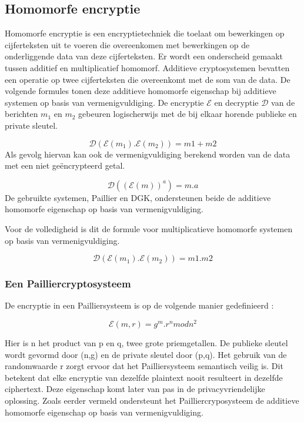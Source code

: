 \subsection{Homomorfe encryptie}
Homomorfe encryptie is een encryptietechniek die toelaat om bewerkingen op cijferteksten uit te voeren die overeenkomen met bewerkingen op de onderliggende data van deze cijferteksten. Er wordt een onderscheid gemaakt tussen additief en multiplicatief homomorf. Additieve cryptosystemen bevatten een operatie op twee cijferteksten die overeenkomt met de som van de data. De volgende formules \cite{erkin:generating} tonen deze additieve homomorfe eigenschap bij additieve systemen op basis van vermenigvuldiging. De encryptie $\mathcal{E}$ en decryptie $\mathcal{D}$ van de berichten $m_1$ en $m_2$ gebeuren logischerwijs met de bij elkaar horende publieke en private sleutel.

\begin{equation}\label{pearson}\mathcal{D}(\mathcal{E}(m_1).\mathcal{E}(m_2)) = m1 + m2
\end{equation}
Als gevolg hiervan kan ook de vermenigvuldiging berekend worden van de data met een niet ge\"encrypteerd getal.

\begin{equation}\label{pearson}\mathcal{D}((\mathcal{E}(m))^a) = m.a
\end{equation}
De gebruikte systemen, Paillier en DGK, ondersteunen beide de additieve homomorfe eigenschap op basis van vermenigvuldiging.

Voor de volledigheid is dit de formule voor multiplicatieve homomorfe systemen op basis van vermenigvuldiging.

\begin{equation}\label{pearson}\mathcal{D}(\mathcal{E}(m_1).\mathcal{E}(m_2)) = m1 . m2
\end{equation}
\subsubsection{Een Pailliercryptosysteem}
\label{paillier}
De encryptie in een Pailliersysteem is op de volgende manier gedefinieerd \cite{erkin:generating}:

\begin{equation}\label{pearson}\mathcal{E}(m,r) = g^m.r^n mod n^2
\end{equation}

Hier is n het product van p en q, twee grote priemgetallen. De publieke sleutel wordt gevormd door (n,g) en de private sleutel door (p,q). Het gebruik van de randomwaarde r zorgt ervoor dat het Pailliersysteem semantisch veilig is. Dit betekent dat elke encryptie van dezelfde plaintext nooit resulteert in dezelfde ciphertext. Deze eigenschap komt later van pas in de privacyvriendelijke oplossing.
Zoals eerder vermeld ondersteunt het Pailliercryposysteem de additieve homomorfe eigenschap op basis van vermenigvuldiging. 
\begin{comment}
Deze eigenschap kan snel aangetoond worden. 
\end{comment}
